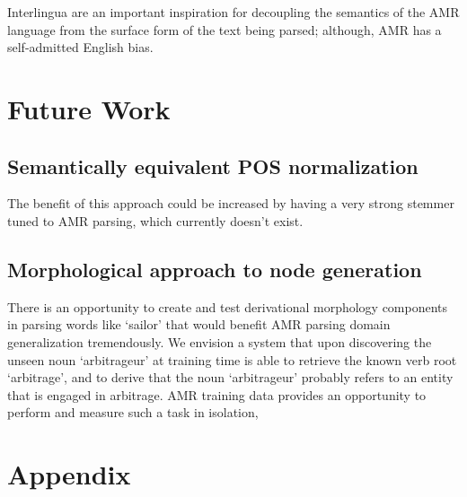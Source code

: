 \documentclass[11pt]{article}
\begin{document}
Interlingua
  \cite{1991mitamura-interlingua,1999carbonell-interlingua,1998levin-interlingua}
  are an important inspiration for decoupling the semantics of the AMR language
  from the surface form of the text being parsed; although, AMR has a self-admitted
  English bias.


\section{Future Work}
\subsection{Semantically equivalent POS normalization}
The benefit of this approach could be increased by having a very strong stemmer tuned to AMR parsing, which currently doesn't exist.

\subsection{Morphological approach to node generation}
There is an opportunity to create and test derivational morphology components in parsing words like `sailor' that would benefit AMR parsing domain generalization tremendously. We envision a system that upon discovering the unseen noun `arbitrageur' at training time is able to retrieve the known verb root `arbitrage', and to derive that the noun `arbitrageur' probably refers to an entity that is engaged in arbitrage. AMR training data provides an opportunity to perform and measure such a task in isolation, 

\section{Appendix}
\end{document}
